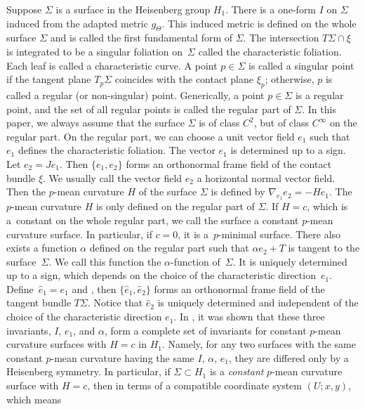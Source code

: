 \documentclass[pdftex]{sigma}
\numberwithin{equation}{section}
\begin{document}
Suppose $\Sigma$ is a surface in the Heisenberg group $H_{1}$. There is a one-form $I$ on $\Sigma$ induced from the adapted metric $g_{\Theta}$. This induced metric is defined on the whole surface $\Sigma$ and is called the first fundamental form of $\Sigma$. The intersection $T\Sigma\cap\xi$ is integrated to be a singular foliation on~$\Sigma$ called the characteristic foliation. Each leaf is called a characteristic curve. A point $p\in\Sigma$ is called a singular point if the tangent plane $T_{p}\Sigma$ coincides with the contact plane $\xi_{p}$; otherwise, $p$ is called a regular (or non-singular) point. Generically, a point $p\in\Sigma$ is a regular point, and the set of all regular points is called the regular part of $\Sigma$. In this paper, we always assume that the surface $\Sigma$ is of class $C^{2}$, but of class $C^{\infty}$ on the regular part.
On the regular part, we can choose a unit vector field $e_{1}$ such that $e_{1}$ defines the characteristic foliation. The vector $e_{1}$ is determined up to a sign. Let $e_{2}=Je_{1}$. Then $\{e_{1},e_{2}\}$ forms an orthonormal frame field of the contact bundle $\xi$. We usually call the vector field $e_{2}$ a horizontal normal vector field. Then the $p$-mean curvature $H$ of the surface $\Sigma$ is defined by
$
\nabla_{e_{1}}e_{2}=-He_{1}$.
The $p$-mean curvature $H$ is only defined on the regular part of $\Sigma$. If $H=c$, which is a~constant on the whole regular part, we call the surface a constant $p$-mean curvature surface. In particular, if $c=0$, it is a~$p$-minimal surface. There also exists a function $\alpha$ defined on the regular part such that $\alpha e_{2}+T$ is tangent to the surface~$\Sigma$. We call this function the $\alpha$-function of~$\Sigma$. It is uniquely determined up to a sign, which depends on the choice of the characteristic direction~$e_{1}$. Define~${\hat{e}_{1}=e_{1}}$ and , then $\{\hat{e}_{1},\hat{e}_{2}\}$ forms an orthonormal frame field of the tangent bundle $T\Sigma$. Notice that $\hat{e}_{2}$ is uniquely determined and independent of the choice of the characteristic direction $e_{1}$. In \cite{ChiuH/HuangY/LaiS:2017,ChiuH/LaiS:2015}, it was shown that these three invariants,
$I$, $e_{1}$, and $\alpha$,
form a complete set of invariants for constant $p$-mean curvature surfaces with $H=c$ in $H_{1}$. Namely, for any two surfaces with the same constant $p$-mean curvature having the same $I$, $\alpha$, $e_1$, they are differed only by a Heisenberg symmetry. In particular, if $\Sigma\subset H_{1}$ is a \emph{constant} $p$-mean curvature surface with $H=c$, then in terms of a compatible coordinate system $(U; x,y)$, which means
\end{document}
